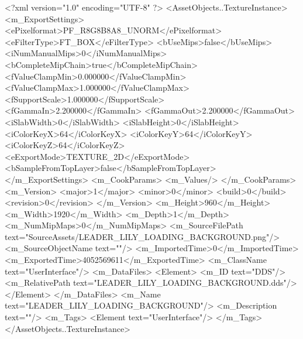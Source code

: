 <?xml version="1.0" encoding="UTF-8" ?>
<AssetObjects..TextureInstance>
	<m_ExportSettings>
		<ePixelformat>PF_R8G8B8A8_UNORM</ePixelformat>
		<eFilterType>FT_BOX</eFilterType>
		<bUseMips>false</bUseMips>
		<iNumManualMips>0</iNumManualMips>
		<bCompleteMipChain>true</bCompleteMipChain>
		<fValueClampMin>0.000000</fValueClampMin>
		<fValueClampMax>1.000000</fValueClampMax>
		<fSupportScale>1.000000</fSupportScale>
		<fGammaIn>2.200000</fGammaIn>
		<fGammaOut>2.200000</fGammaOut>
		<iSlabWidth>0</iSlabWidth>
		<iSlabHeight>0</iSlabHeight>
		<iColorKeyX>64</iColorKeyX>
		<iColorKeyY>64</iColorKeyY>
		<iColorKeyZ>64</iColorKeyZ>
		<eExportMode>TEXTURE_2D</eExportMode>
		<bSampleFromTopLayer>false</bSampleFromTopLayer>
	</m_ExportSettings>
	<m_CookParams>
		<m_Values/>
	</m_CookParams>
	<m_Version>
		<major>1</major>
		<minor>0</minor>
		<build>0</build>
		<revision>0</revision>
	</m_Version>
	<m_Height>960</m_Height>
	<m_Width>1920</m_Width>
	<m_Depth>1</m_Depth>
	<m_NumMipMaps>0</m_NumMipMaps>
	<m_SourceFilePath text="SourceAssets/LEADER_LILY_LOADING_BACKGROUND.png"/>
	<m_SourceObjectName text=""/>
	<m_ImportedTime>0</m_ImportedTime>
	<m_ExportedTime>4052569611</m_ExportedTime>
	<m_ClassName text="UserInterface"/>
	<m_DataFiles>
		<Element>
			<m_ID text="DDS"/>
			<m_RelativePath text="LEADER_LILY_LOADING_BACKGROUND.dds"/>
		</Element>
	</m_DataFiles>
	<m_Name text="LEADER_LILY_LOADING_BACKGROUND"/>
	<m_Description text=""/>
	<m_Tags>
		<Element text="UserInterface"/>
	</m_Tags>
</AssetObjects..TextureInstance>

